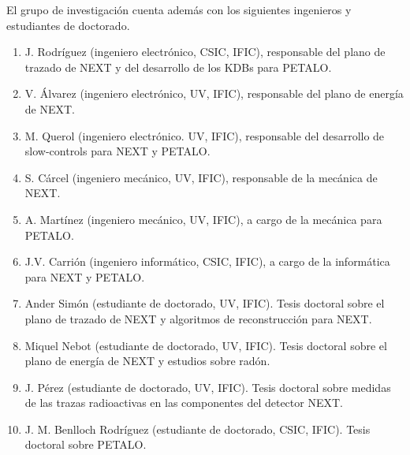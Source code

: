 El grupo de investigación cuenta además con los siguientes ingenieros y estudiantes de doctorado. 
\begin{enumerate}
\item J. Rodríguez (ingeniero electrónico, CSIC, IFIC), responsable del plano de trazado de NEXT y del desarrollo de los KDBs para PETALO. 
\item V. Álvarez (ingeniero electrónico, UV, IFIC), responsable del plano de energía de NEXT.
\item M. Querol (ingeniero electrónico. UV, IFIC), responsable del desarrollo de slow-controls para NEXT y PETALO.
\item S. Cárcel (ingeniero mecánico, UV, IFIC), responsable de la mecánica de NEXT.
\item A. Martínez (ingeniero mecánico, UV, IFIC), a cargo de la mecánica para PETALO. 
\item J.V. Carrión (ingeniero informático, CSIC, IFIC), a cargo de la informática para NEXT y PETALO. 
\item Ander Simón (estudiante de doctorado, UV, IFIC). Tesis doctoral sobre el plano de trazado de NEXT y algoritmos de reconstrucción para NEXT.
\item Miquel Nebot (estudiante de doctorado, UV, IFIC). Tesis doctoral sobre el plano de energía de NEXT y estudios sobre radón.
\item J. Pérez (estudiante de doctorado, UV, IFIC). Tesis doctoral sobre medidas de las trazas radioactivas en las componentes del detector NEXT.
\item J. M. Benlloch Rodríguez (estudiante de doctorado, CSIC, IFIC). Tesis doctoral sobre PETALO.  
\end{enumerate}

























